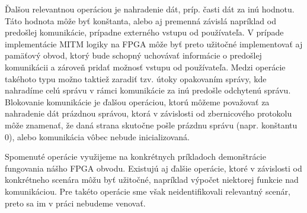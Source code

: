 Ďalšou relevantnou operáciou je nahradenie dát, príp. časti dát za inú hodnotu. Táto hodnota môže byť konštanta, alebo aj premenná závislá napríklad od predošlej komunikácie, prípadne externého vstupu od používateľa. V prípade implementácie MITM logiky na FPGA môže byť preto užitočné implementovať aj pamäťový obvod, ktorý bude schopný uchovávať informácie o predošlej komunikácii a zároveň pridať možnosť vstupu od používateľa. Medzi operácie takéhoto typu možno taktiež zaradiť tzv. útoky opakovaním správy, kde nahradíme celú správu v rámci komunikácie za inú predošle odchytenú správu. Blokovanie komunikácie je ďalšou operáciou, ktorú môžeme považovať za nahradenie dát prázdnou správou, ktorá v závislosti od zbernicového protokolu môže znamenať, že daná strana skutočne pošle prázdnu správu (napr. konštantu 0), alebo komunikácia vôbec nebude inicializovaná.

Spomenuté operácie využijeme na konkrétnych príkladoch demonštrácie fungovania nášho FPGA obvodu. Existujú aj ďalšie operácie, ktoré v závislosti od konkrétneho scenára môžu byť užitočné, napríklad výpočet niektorej funkcie nad komunikáciou. Pre takéto operácie sme však neidentifikovali relevantný scenár, preto sa im v práci nebudeme venovať.